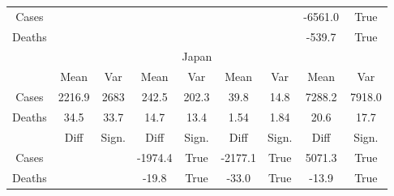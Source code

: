 \documentclass{article}
\begin{document}
\begin{table}[ht]
\begin{tabular}{ccccccccc}
Cases  &               &                &         &               &            &               & -6561.0        & True              \\
Deaths &               &                &          &               &            &               & -539.7          & True              \\ \hline
\multicolumn{9}{c}{Japan}                                                                                                                      \\ \hline
       & Mean          & Var       & Mean           & Var          & Mean       & Var      & Mean           & Var          \\ \hline
Cases  & 2216.9        & 2683           & 242.5          & 202.3             & 39.8       & 14.8          & 7288.2         & 7918.0            \\
Deaths & 34.5          & 33.7           & 14.7           & 13.4              & 1.54       & 1.84          & 20.6           & 17.7              \\ \hline
       & Diff          & Sign.          & Diff           & Sign.       & Diff       & Sign.   & Diff           & Sign.       \\ \hline
Cases  &               &                & -1974.4        & True              & -2177.1    & True          & 5071.3         & True              \\
Deaths &               &                & -19.8          & True              & -33.0      & True          & -13.9          & True              \\ \hline
\end{tabular}
\\

\label{Tab:cases1}
\end{table}
\end{document}
